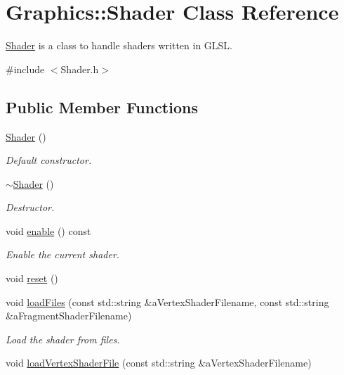 \hypertarget{class_graphics_1_1_shader}{
\section{Graphics::Shader Class Reference}
\label{class_graphics_1_1_shader}
}


\hyperlink{class_graphics_1_1_shader}{Shader} is a class to handle shaders written in GLSL.  




{\ttfamily \#include $<$Shader.h$>$}

\subsection*{Public Member Functions}
\begin{DoxyCompactItemize}
\item 
\hyperlink{class_graphics_1_1_shader_ad0d4a9bd03afe7a728cfb1a820e1d48a}{Shader} ()
\begin{DoxyCompactList}\small\item\em Default constructor. \end{DoxyCompactList}\item 
\hyperlink{class_graphics_1_1_shader_a89635504b68c4c591354d8a5bd887599}{$\sim$Shader} ()
\begin{DoxyCompactList}\small\item\em Destructor. \end{DoxyCompactList}\item 
void \hyperlink{class_graphics_1_1_shader_af5c60b74752b35c18dda9765a1906df8}{enable} () const 
\begin{DoxyCompactList}\small\item\em Enable the current shader. \end{DoxyCompactList}\item 
void \hyperlink{class_graphics_1_1_shader_a8b3873b50b15b053ca10334d919c5ea8}{reset} ()
\item 
void \hyperlink{class_graphics_1_1_shader_aa1bdb3991bed269afb6d7bd1c3d922d0}{loadFiles} (const std::string \&aVertexShaderFilename, const std::string \&aFragmentShaderFilename)
\begin{DoxyCompactList}\small\item\em Load the shader from files. \end{DoxyCompactList}\item 
void \hyperlink{class_graphics_1_1_shader_a0da28f14dc9ca5c8e008923184bee66d}{loadVertexShaderFile} (const std::string \&aVertexShaderFilename)

\end{DoxyCompactItemize}
